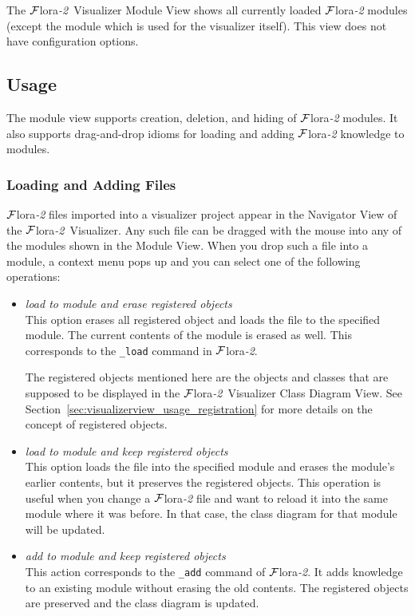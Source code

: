\documentclass[a4paper,11pt]{article}
\newcommand{\FLORA}{{\mbox{\sc ${\cal F}${lora}\rm\emph{-2}}}\xspace}
\newcommand{\FVIZ}{{\mbox{\sc ${\cal F}${lora}\rm\emph{-2} {Visualizer}}}\xspace}
\begin{document}
The \FVIZ Module View shows all currently loaded \FLORA modules (except the
module which is used for the visualizer itself).
This view does not have configuration options.

\subsection{Usage}
\label{sec:moduleview_usage}

The module view supports
creation, deletion, and hiding of \FLORA modules. It also supports
drag-and-drop idioms for loading and adding \FLORA knowledge to modules.

\subsubsection{Loading and Adding Files}
\label{sec:moduleview_usage_loadingandadding}

\FLORA files imported into a visualizer project appear in the Navigator
View of the \FVIZ. Any such file can be dragged with the mouse into any of the
modules shown in the Module View. When you drop such a file into a module,
a context menu pops up and you can select one of the following operations:

\begin{itemize}
\item \emph{load to module and erase registered objects}\\
  This option erases all registered object and loads the file to the
  specified module. The current contents of the module is erased as well.
  This corresponds to the {\tt \_load} command in \FLORA.

  The registered objects mentioned here are the objects and classes that
  are supposed to be displayed in the \FVIZ Class Diagram View. See
  Section~\ref{sec:visualizerview_usage_registration} for more details on
  the concept of registered objects.

\item \emph{load to module and keep registered objects}\\
  This option loads the file into the specified module and erases the
  module's earlier contents, but it preserves the registered objects.
  This operation is useful when you change a \FLORA file and want to reload
  it into the same module where it was before. In that case, the class
  diagram for that module will be updated.

\item \emph{add to module and keep registered objects}\\
  This action corresponds to the {\tt \_add} command of \FLORA. It adds
  knowledge to an existing module without erasing the old contents. 
  The registered objects are preserved and the class diagram is updated.
\end{itemize}
\end{document}
